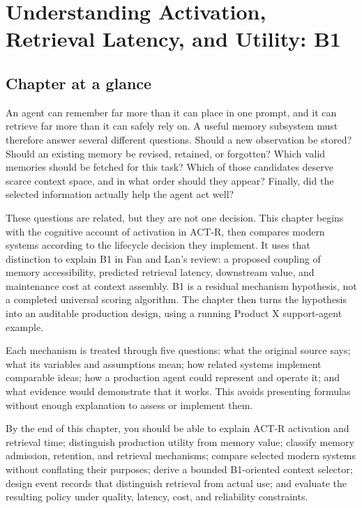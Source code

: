 \chapter{Understanding Activation, Retrieval Latency, and Utility: B1}
\label{ch:activation-latency-utility}

\section*{Chapter at a glance}
{}

An agent can remember far more than it can place in one prompt, and it can retrieve far more than it can safely rely on. A useful memory subsystem must therefore answer several different questions. Should a new observation be stored? Should an existing memory be revised, retained, or forgotten? Which valid memories should be fetched for this task? Which of those candidates deserve scarce context space, and in what order should they appear? Finally, did the selected information actually help the agent act well?

These questions are related, but they are not one decision. This chapter begins with the cognitive account of activation in ACT-R, then compares modern systems according to the lifecycle decision they implement. It uses that distinction to explain B1 in Fan and Lan's review: a proposed coupling of memory accessibility, predicted retrieval latency, downstream value, and maintenance cost at context assembly. B1 is a residual mechanism hypothesis, not a completed universal scoring algorithm. The chapter then turns the hypothesis into an auditable production design, using a running Product X support-agent example.

Each mechanism is treated through five questions: what the original source says; what its variables and assumptions mean; how related systems implement comparable ideas; how a production agent could represent and operate it; and what evidence would demonstrate that it works. This avoids presenting formulas without enough explanation to assess or implement them.

\begin{learningbox}
By the end of this chapter, you should be able to explain ACT-R activation and retrieval time; distinguish production utility from memory value; classify memory admission, retention, and retrieval mechanisms; compare selected modern systems without conflating their purposes; derive a bounded B1-oriented context selector; design event records that distinguish retrieval from actual use; and evaluate the resulting policy under quality, latency, cost, and reliability constraints.
\end{learningbox}

